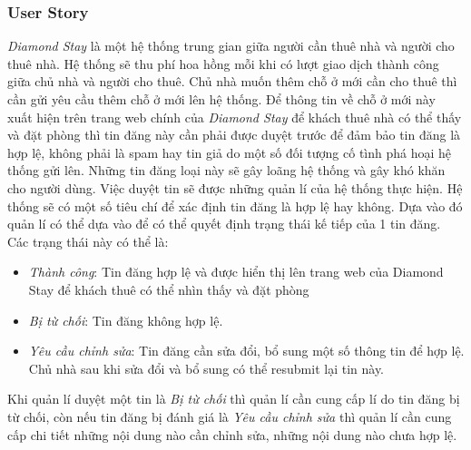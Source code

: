 \subsubsection{User Story}
\textit{Diamond Stay} là một hệ thống trung gian giữa người cần thuê nhà và người cho thuê nhà. Hệ thống sẽ thu phí hoa hồng mỗi khi có lượt giao dịch thành công giữa chủ nhà và người cho thuê. Chủ nhà muốn thêm chỗ ở mới cần cho thuê thì cần gửi yêu cầu thêm chỗ ở mới lên hệ thống. Để thông tin về chỗ ở mới này xuất hiện trên trang web chính của \textit{Diamond Stay} để khách thuê nhà có thể thấy và đặt phòng thì tin đăng này cần phải được duyệt trước để đảm bảo tin đăng là hợp lệ, không phải là spam hay tin giả do một số đối tượng cố tình phá hoại hệ thống gửi lên. Những tin đăng loại này sẽ gây loãng hệ thống và gây khó khăn cho người dùng. Việc duyệt tin sẽ được những quản lí của hệ thống thực hiện. Hệ thống sẽ có một số tiêu chí để xác định tin đăng là hợp lệ hay không. Dựa vào đó quản lí có thể dựa vào để có thể quyết định trạng thái kế tiếp của 1 tin đăng. Các trạng thái này có thể là:
\begin{itemize}
	\item \textit{Thành công}: Tin đăng hợp lệ và được hiển thị lên trang web của Diamond Stay để khách thuê có thể nhìn thấy và đặt phòng 
	\item \textit{Bị từ chối}: Tin đăng không hợp lệ.
	\item \textit{Yêu cầu chỉnh sửa}: Tin đăng cần sửa đổi, bổ sung một số thông tin để hợp lệ. Chủ nhà sau khi sửa đổi và bổ sung có thể resubmit lại tin này.
\end{itemize}
Khi quản lí duyệt một tin là \textit{Bị từ chối} thì quản lí cần cung cấp lí do tin đăng bị từ chối, còn nếu tin đăng bị đánh giá là \textit{Yêu cầu chỉnh sửa} thì quản lí cần cung cấp chi tiết những nội dung nào cần chỉnh sửa, những nội dung nào chưa hợp lệ.
